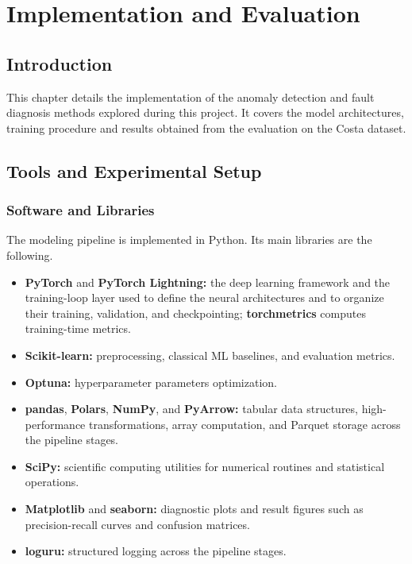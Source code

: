 \chapter{Implementation and Evaluation}
\label{ch:implementation}

\section{Introduction}
This chapter details the implementation of the anomaly detection and fault diagnosis methods explored during this project. It covers the model architectures, training procedure and results
obtained from the evaluation on the Costa dataset.

\section{Tools and Experimental Setup}
\subsection{Software and Libraries}
The modeling pipeline is implemented in Python. Its main libraries are the following.

\begin{itemize}
    \item \textbf{PyTorch} and \textbf{PyTorch Lightning:} the deep learning framework and the training-loop layer used to define the neural architectures and to organize their training, validation, and checkpointing; \textbf{torchmetrics} computes training-time metrics.
    \item \textbf{Scikit-learn:} preprocessing, classical ML baselines, and evaluation metrics.
    \item \textbf{Optuna:} hyperparameter parameters optimization.
    \item \textbf{pandas}, \textbf{Polars}, \textbf{NumPy}, and \textbf{PyArrow:} tabular data structures, high-performance transformations, array computation, and Parquet storage across the pipeline stages.
    \item \textbf{SciPy:} scientific computing utilities for numerical routines and statistical operations.
    \item \textbf{Matplotlib} and \textbf{seaborn:} diagnostic plots and result figures such as precision-recall curves and confusion matrices.
    \item \textbf{loguru:} structured logging across the pipeline stages.
\end{itemize}

